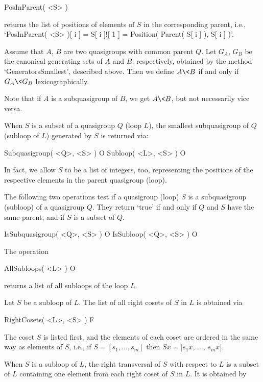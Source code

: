 \>PosInParent( <S> )

returns the list of positions of elements of $S$ in the corresponding parent,
i.e., `PosInParent( <S> )[ i ] = S[ i ]![ 1 ] = Position( Parent( S[ i ] ), S[
i ] )'.


\noindent Assume that $A$, $B$ are two quasigroups with common parent $Q$. Let
$G_A$, $G_B$ be the canonical generating sets of $A$ and $B$, respectively,
obtained by the method `GeneratorsSmallest', described above. Then we
define $A \< B$ if and only if $G_A \< G_B$ lexicographically.

Note that if $A$ is a subquasigroup of $B$, we get $A\<B$, but not necessarily
vice versa.



When $S$ is a subset of a quasigroup $Q$ (loop $L$), the smallest subquasigroup
of $Q$ (subloop of $L$) generated by $S$ is returned via:

\>Subquasigroup( <Q>, <S> ) O
\>Subloop( <L>, <S> ) O

In fact, we allow $S$ to be a list of integers, too, representing the positions
of the respective elements in the parent quasigroup (loop).

The following two operations test if a quasigroup (loop) $S$ is a subquasigroup
(subloop) of a quasigroup $Q$. They return `true' if and only if $Q$ and $S$
have the same parent, and if $S$ is a subset of $Q$.

\>IsSubquasigroup( <Q>, <S> ) O
\>IsSubloop( <Q>, <S> ) O

The operation

\>AllSubloops( <L> ) O

returns a list of all subloops of the loop $L$.

Let $S$ be a subloop of $L$. The list of all right cosets of $S$
in $L$ is obtained via

\>RightCosets( <L>, <S> ) F

The coset $S$ is listed first, and the elements of each coset are ordered in
the same way as elements of $S$, i.e., if $S = [s_1,\dots,s_m]$ then
$Sx=[s_1x$, $\dots$, $s_mx]$.

When $S$ is a subloop of $L$, the right transversal of $S$
with respect to $L$ is a subset of $L$ containing one element from each right
coset of $S$ in $L$. It is obtained by

